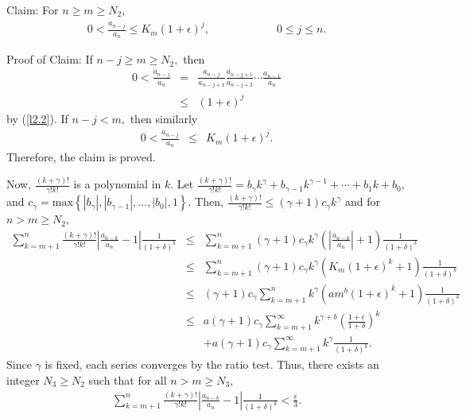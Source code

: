 \documentclass[final]{siamltex}
\begin{document}
 Claim: For $n \geq m \geq N_{2},$
  \begin{eqnarray*} 0 < \frac{a_{n-j}}{a_{n}} \leq K_{m}(1+ \epsilon)^{j}, \hspace{1in} 0 \leq j \leq n.
  \end{eqnarray*}
 
Proof of Claim: If $n-j \geq m \geq N_{2},$ then
  \begin{eqnarray*} 0 < \frac{a_{n-j}}{a_{n}} & = & \frac{a_{n-j}}{a_{n-j+1}} \frac{a_{n-j+1}}{a_{n-j+2}} \cdots \frac{a_{n-1}}{a_{n}} \\
  & \leq & (1 + \epsilon)^{j} 
  \end{eqnarray*} by (\ref{l2.2}).
 If $n-j < m,$ then similarly
  \begin{eqnarray*} 0 < \frac{a_{n-j}}{a_{n}} & \leq & K_{m}(1 + \epsilon)^{j}. 
  \end{eqnarray*}
 Therefore, the claim is proved. 

  Now, $\frac{(k+\gamma)!}{\gamma!k!}$ is a polynomial in $k.$  
 Let $\frac{(k+\gamma)!}{\gamma!k!} = b_{\gamma}k^{\gamma} + b_{\gamma-1}k^{\gamma-1} + \cdots +  b_{1}k + b_{0},$ and $c_{\gamma} = \mbox{max} \left\{ |b_{\gamma}|, |b_{\gamma-1}|, \ldots, |b_{0}|,1 \right\}.$
Then, $\frac{(k+\gamma)!}{\gamma!k!} \leq (\gamma + 1)c_{\gamma}k^{\gamma}$ and for $n > m \geq N_{2},$
 \begin{eqnarray*}  \sum_{k=m+1}^{n} \frac{(k+\gamma)!}{\gamma!k!} \left| \frac{a_{n-k}}{a_{n}} - 1 \right| \frac{1}{(1+ \delta)^{k}} & \leq & \sum_{k=m+1}^{n}(\gamma+1)c_{\gamma}k^{\gamma}\left( \left| \frac{a_{n-k}}{a_{n}} \right| +1 \right) \frac{1}{(1+\delta)^{k}} \\
  & \leq & \sum_{k=m+1}^{n}(\gamma+1)c_{\gamma}k^{\gamma}\left( K_{m}(1+\epsilon)^{k} + 1  \right) \frac{1}{(1+\delta)^{k}} \\
  & \leq & (\gamma+1)c_{\gamma}\sum_{k=m+1}^{n}k^{\gamma}\left( am^{b}(1+\epsilon)^{k} + 1  \right) \frac{1}{(1+\delta)^{k}} \\
  & \leq & a(\gamma+1)c_{\gamma}\sum_{k=m+1}^{\infty} k^{\gamma+b} \left( \frac{1+\epsilon}{1+\delta} \right)^{k} \\
  & & + a(\gamma+1)c_{\gamma}\sum_{k=m+1}^{\infty} k^{\gamma} \frac{1}{(1+\delta)^{k}}.
 \end{eqnarray*}
  Since $\gamma$ is fixed, each series converges by the ratio test. Thus, there exists an integer $N_{3} \geq N_{2}$ such that for all $n > m \geq N_{3},$ \begin{eqnarray*}
  \sum_{k=m+1}^{n} \frac{(k+\gamma)!}{\gamma!k!} \left| \frac{a_{n-k}}{a_{n}} - 1 \right| \frac{1}{(1+\delta)^{k}} < \frac{\epsilon}{3}.
  \end{eqnarray*}
 
\end{document}

